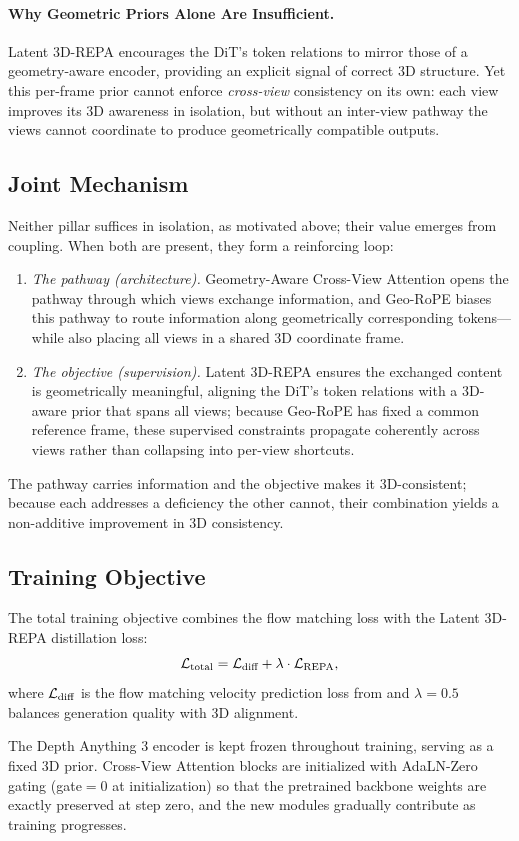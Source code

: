 \paragraph{Why Geometric Priors Alone Are Insufficient.}
Latent 3D-REPA encourages the DiT's token relations to mirror those of a geometry-aware encoder, providing an explicit signal of correct 3D structure. Yet this per-frame prior cannot enforce \emph{cross-view} consistency on its own: each view improves its 3D awareness in isolation, but without an inter-view pathway the views cannot coordinate to produce geometrically compatible outputs.

\subsection{Joint Mechanism}
\label{sec:synergy}

Neither pillar suffices in isolation, as motivated above; their value emerges from coupling. When both are present, they form a reinforcing loop:
\begin{enumerate}
    \item \emph{The pathway (architecture).} Geometry-Aware Cross-View Attention opens the pathway through which views exchange information, and Geo-RoPE biases this pathway to route information along geometrically corresponding tokens---while also placing all views in a shared 3D coordinate frame.
    \item \emph{The objective (supervision).} Latent 3D-REPA ensures the exchanged content is geometrically meaningful, aligning the DiT's token relations with a 3D-aware prior that spans all views; because Geo-RoPE has fixed a common reference frame, these supervised constraints propagate coherently across views rather than collapsing into per-view shortcuts.
\end{enumerate}
The pathway carries information and the objective makes it 3D-consistent; because each addresses a deficiency the other cannot, their combination yields a non-additive improvement in 3D consistency.

\subsection{Training Objective}
\label{sec:training}

The total training objective combines the flow matching loss with the Latent 3D-REPA distillation loss:
\begin{equation}
\label{eq:total-loss}
\mathcal{L}_{\text{total}} = \mathcal{L}_{\text{diff}} + \lambda \cdot \mathcal{L}_{\text{REPA}},
\end{equation}
where $\mathcal{L}_{\text{diff}}$ is the flow matching velocity prediction loss from  and $\lambda = 0.5$ balances generation quality with 3D alignment.

The Depth Anything 3 encoder is kept frozen throughout training, serving as a fixed 3D prior. Cross-View Attention blocks are initialized with AdaLN-Zero gating (gate$=0$ at initialization) so that the pretrained backbone weights are exactly preserved at step zero, and the new modules gradually contribute as training progresses.
